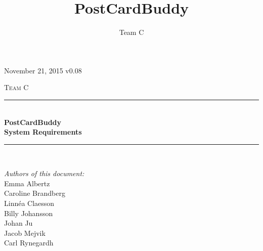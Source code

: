 \documentclass[10pt,a4paper]{article}
\title{PostCardBuddy}
\author{Team C}
\begin{document}
\begin{titlepage}
\newcommand{\HRule}{\rule{\linewidth}{0.5mm}}


\begin{flushright}
November 21, 2015 v0.08\\[3cm]
\end{flushright}


\centering
\textsc{\LARGE Team C}\\[0.5cm]

\HRule \\[0.4cm]
{ \huge \bfseries PostCardBuddy}\\[0.3cm]
{\Large \bfseries System Requirements}\\[0.4cm] %
\HRule \\[1.5cm]

\vfill
\begin{flushleft}
\textit{Authors of this document:}\\
Emma Albertz\\
Caroline Brandberg\\
Linnéa Claesson\\
Billy Johansson\\
Johan Ju\\
Jacob Mejvik\\
Carl Rynegardh
\end{flushleft}

\end{titlepage}



%



\setcounter{tocdepth}{2}
\tableofcontents
\newpage
{}


\end{document}
